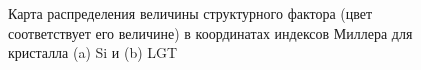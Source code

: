   \begin{figure}[h]
    \centering
    \hfill
    \caption{Карта распределения величины структурного фактора
    (цвет соответствует его величине) в координатах индексов Миллера для кристалла (a) Si и (b) LGT}
    \label{ris:hkl_LGT_SI}
  \end{figure}
